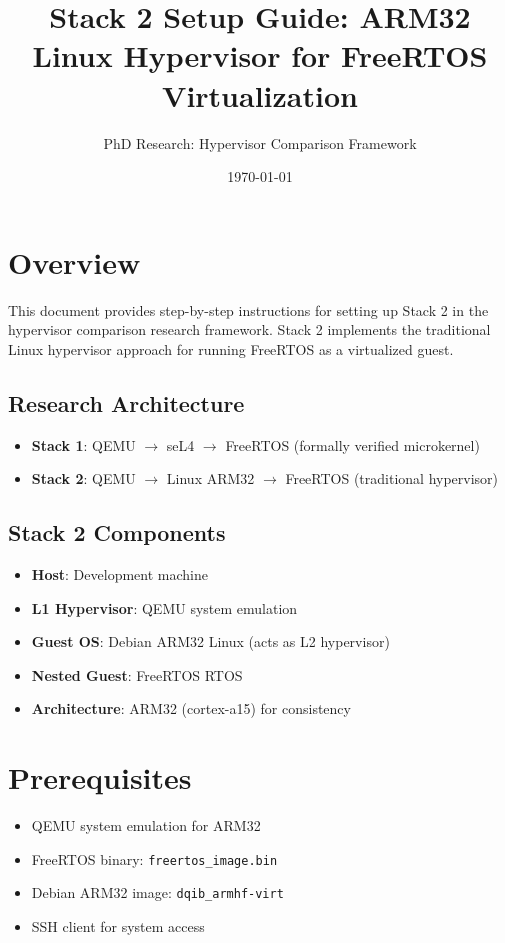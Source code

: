 \documentclass{article}
\title{Stack 2 Setup Guide: ARM32 Linux Hypervisor for FreeRTOS Virtualization}
\author{PhD Research: Hypervisor Comparison Framework}
\date{\today}
\begin{document}
\maketitle

\section{Overview}

This document provides step-by-step instructions for setting up Stack 2 in the hypervisor comparison research framework. Stack 2 implements the traditional Linux hypervisor approach for running FreeRTOS as a virtualized guest.

\subsection{Research Architecture}

\begin{itemize}
    \item \textbf{Stack 1}: QEMU $\rightarrow$ seL4 $\rightarrow$ FreeRTOS (formally verified microkernel)
    \item \textbf{Stack 2}: QEMU $\rightarrow$ Linux ARM32 $\rightarrow$ FreeRTOS (traditional hypervisor)
\end{itemize}

\subsection{Stack 2 Components}

\begin{itemize}
    \item \textbf{Host}: Development machine
    \item \textbf{L1 Hypervisor}: QEMU system emulation
    \item \textbf{Guest OS}: Debian ARM32 Linux (acts as L2 hypervisor)
    \item \textbf{Nested Guest}: FreeRTOS RTOS
    \item \textbf{Architecture}: ARM32 (cortex-a15) for consistency
\end{itemize}

\section{Prerequisites}

\begin{itemize}
    \item QEMU system emulation for ARM32
    \item FreeRTOS binary: \texttt{freertos\_image.bin}
    \item Debian ARM32 image: \texttt{dqib\_armhf-virt}
    \item SSH client for system access
\end{itemize}
\end{document}
